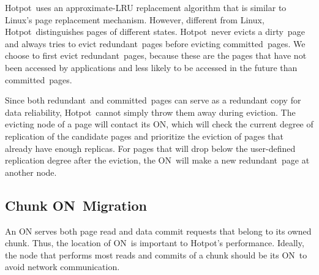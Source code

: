 \documentclass[sigconf]{acmart}
\newcommand{\hotpot}{Hotpot}
\newcommand{\on}{ON}
\newcommand{\dn}{DN}
\newcommand{\dirty}{dirty}
\newcommand{\committed}{committed}
\newcommand{\redundant}{redundant}
\providecommand{\DIFaddbegin}{} %
\providecommand{\DIFaddend}{} %
\providecommand{\DIFdelbegin}{} %
\providecommand{\DIFdelend}{} %
\begin{document}
{\hotpot\ uses an approximate-LRU replacement algorithm that is similar to Linux's page replacement mechanism.
However, different from Linux,
\hotpot\ distinguishes pages of different states.
\hotpot\ never evicts a \dirty\ page
and always tries to evict \redundant\ pages before evicting \committed\ pages.
We choose to first evict \redundant\ pages, 
because these are the pages that have not been accessed by applications
and less likely to be accessed in the future than \committed\ pages. %

Since both \redundant\ and \committed\ pages can serve as a redundant copy
for data reliability, \hotpot\ cannot simply throw them away during eviction.
The evicting node of a page will contact its \on{}, 
which will check the current degree of replication of the candidate pages 
and prioritize the eviction of pages that already have enough replicas. 
For pages that will drop below the user-defined replication degree after the eviction, 
the \on\ will make a new \redundant\ page at another node. %

\DIFdelbegin %

\DIFdelend \DIFaddbegin \subsection{Chunk \on\ Migration}
\DIFaddend \label{sec:migration}
\DIFdelbegin %
\DIFdelend An \on{} serves both page read and data commit requests that belong to its owned chunk.
Thus, the location of \on\ is important to \hotpot's performance.
Ideally, the node that performs most reads and commits of a chunk 
should be its \on\ to avoid network communication.

}
\end{document}
